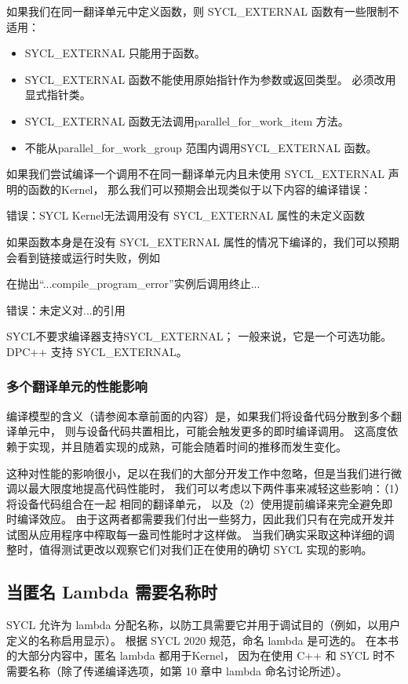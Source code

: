 如果我们在同一翻译单元中定义函数，则 SYCL\_EXTERNAL 函数有一些限制不适用：

\begin{itemize}
	\item SYCL\_EXTERNAL 只能用于函数。

	\item SYCL\_EXTERNAL 函数不能使用原始指针作为参数或返回类型。 必须改用显式指针类。

	\item SYCL\_EXTERNAL 函数无法调用parallel\_for\_work\_item 方法。

	\item 不能从parallel\_for\_work\_group 范围内调用SYCL\_EXTERNAL 函数。
\end{itemize}

如果我们尝试编译一个调用不在同一翻译单元内且未使用 SYCL\_EXTERNAL 声明的函数的Kernel，
那么我们可以预期会出现类似于以下内容的编译错误：

错误：SYCL Kernel无法调用没有 SYCL\_EXTERNAL 属性的未定义函数

如果函数本身是在没有 SYCL\_EXTERNAL 属性的情况下编译的，我们可以预期会看到链接或运行时失败，例如

在抛出“...compile\_program\_error”实例后调用终止...

错误：未定义对...的引用

SYCL不要求编译器支持SYCL\_EXTERNAL； 一般来说，它是一个可选功能。 DPC++ 支持 SYCL\_EXTERNAL。

\subsubsection{多个翻译单元的性能影响}
编译模型的含义（请参阅本章前面的内容）是，如果我们将设备代码分散到多个翻译单元中，
则与设备代码共置相比，可能会触发更多的即时编译调用。 
这高度依赖于实现，并且随着实现的成熟，可能会随着时间的推移而发生变化。

这种对性能的影响很小，足以在我们的大部分开发工作中忽略，但是当我们进行微调以最大限度地提高代码性能时，
我们可以考虑以下两件事来减轻这些影响：（1）将设备代码组合在一起 相同的翻译单元，
以及（2）使用提前编译来完全避免即时编译效应。 
由于这两者都需要我们付出一些努力，因此我们只有在完成开发并试图从应用程序中榨取每一盎司性能时才这样做。 
当我们确实采取这种详细的调整时，值得测试更改以观察它们对我们正在使用的确切 SYCL 实现的影响。

\subsection{当匿名 Lambda 需要名称时}
SYCL 允许为 lambda 分配名称，以防工具需要它并用于调试目的（例如，以用户定义的名称启用显示）。 
根据 SYCL 2020 规范，命名 lambda 是可选的。 
在本书的大部分内容中，匿名 lambda 都用于Kernel，
因为在使用 C++ 和 SYCL 时不需要名称（除了传递编译选项，如第 10 章中 lambda 命名讨论所述）。

